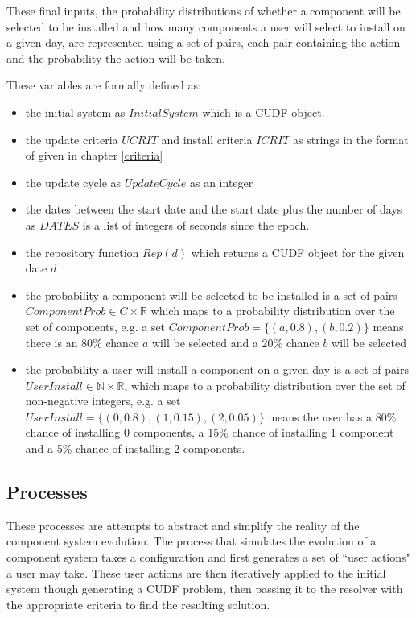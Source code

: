 These final inputs, the probability distributions of whether a component will be selected to be installed and how many components a user will select to install on a given day,
are represented using a set of pairs, each pair containing the action and the probability the action will be taken.

These variables are formally defined as:
\begin{itemize}
  \item the initial system as $InitialSystem$ which is a CUDF object.
  \item the update criteria $UCRIT$ and install criteria $ICRIT$ as strings in the format of given in chapter \ref{criteria}
  \item the update cycle as $UpdateCycle$ as an integer
  \item the dates between the start date and the start date plus the number of days as $DATES$ is a list of integers of seconds since the epoch.
  \item the repository function $Rep(d)$ which returns a CUDF object for the given date $d$
  \item the probability a component will be selected to be installed is a set of pairs $ComponentProb \in C \times \mathbb{R}$ which maps to a probability distribution over the set of components,
  e.g. a set $ComponentProb = \{ (a,0.8) , (b,0.2)\}$ means there is an 80\% chance $a$ will be selected and a 20\% chance $b$ will be selected
  \item the probability a user will install a component on a given day is a set of pairs $UserInstall \in \mathbb{N} \times \mathbb{R}$, which maps to a probability distribution over the set of non-negative integers,
  e.g.  a set $UserInstall = \{ (0,0.8) , (1,0.15), (2,0.05)\}$ means the user has a 80\% chance of installing 0 components, a 15\% chance of installing 1 component and a
  5\% chance of installing 2 components.
\end{itemize} 


\subsection{Processes}
These processes are attempts to abstract and simplify the reality of the component system evolution.
The process that simulates the evolution of a component system takes a configuration and first generates a set of ``user actions" a user may take.
These user actions are then iteratively applied to the initial system though generating a CUDF problem,
then passing it to the resolver with the appropriate criteria to find the resulting solution.

